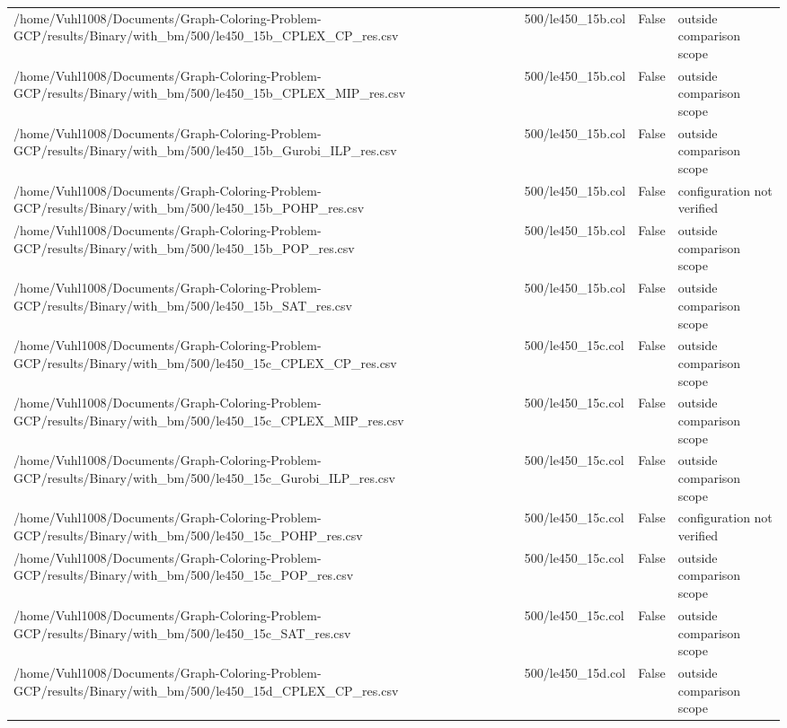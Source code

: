 \begin{table}[htbp]
\begin{tabular}{llll}
/home/Vuhl1008/Documents/Graph-Coloring-Problem-GCP/results/Binary/with\_bm/500/le450\_15b\_CPLEX\_CP\_res.csv & 500/le450\_15b.col & False & outside comparison scope \\
/home/Vuhl1008/Documents/Graph-Coloring-Problem-GCP/results/Binary/with\_bm/500/le450\_15b\_CPLEX\_MIP\_res.csv & 500/le450\_15b.col & False & outside comparison scope \\
/home/Vuhl1008/Documents/Graph-Coloring-Problem-GCP/results/Binary/with\_bm/500/le450\_15b\_Gurobi\_ILP\_res.csv & 500/le450\_15b.col & False & outside comparison scope \\
/home/Vuhl1008/Documents/Graph-Coloring-Problem-GCP/results/Binary/with\_bm/500/le450\_15b\_POHP\_res.csv & 500/le450\_15b.col & False & configuration not verified \\
/home/Vuhl1008/Documents/Graph-Coloring-Problem-GCP/results/Binary/with\_bm/500/le450\_15b\_POP\_res.csv & 500/le450\_15b.col & False & outside comparison scope \\
/home/Vuhl1008/Documents/Graph-Coloring-Problem-GCP/results/Binary/with\_bm/500/le450\_15b\_SAT\_res.csv & 500/le450\_15b.col & False & outside comparison scope \\
/home/Vuhl1008/Documents/Graph-Coloring-Problem-GCP/results/Binary/with\_bm/500/le450\_15c\_CPLEX\_CP\_res.csv & 500/le450\_15c.col & False & outside comparison scope \\
/home/Vuhl1008/Documents/Graph-Coloring-Problem-GCP/results/Binary/with\_bm/500/le450\_15c\_CPLEX\_MIP\_res.csv & 500/le450\_15c.col & False & outside comparison scope \\
/home/Vuhl1008/Documents/Graph-Coloring-Problem-GCP/results/Binary/with\_bm/500/le450\_15c\_Gurobi\_ILP\_res.csv & 500/le450\_15c.col & False & outside comparison scope \\
/home/Vuhl1008/Documents/Graph-Coloring-Problem-GCP/results/Binary/with\_bm/500/le450\_15c\_POHP\_res.csv & 500/le450\_15c.col & False & configuration not verified \\
/home/Vuhl1008/Documents/Graph-Coloring-Problem-GCP/results/Binary/with\_bm/500/le450\_15c\_POP\_res.csv & 500/le450\_15c.col & False & outside comparison scope \\
/home/Vuhl1008/Documents/Graph-Coloring-Problem-GCP/results/Binary/with\_bm/500/le450\_15c\_SAT\_res.csv & 500/le450\_15c.col & False & outside comparison scope \\
/home/Vuhl1008/Documents/Graph-Coloring-Problem-GCP/results/Binary/with\_bm/500/le450\_15d\_CPLEX\_CP\_res.csv & 500/le450\_15d.col & False & outside comparison scope \\

\end{tabular}
\end{table}
